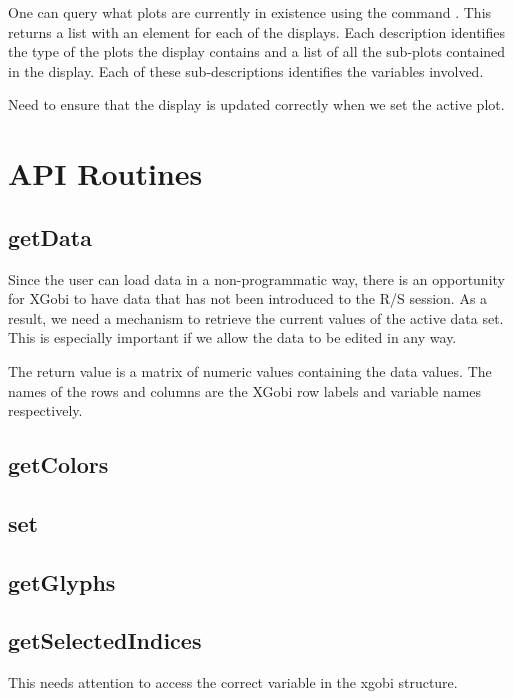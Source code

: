 One can query what plots are currently in existence using the command
.  This returns a list with an element
for each of the displays. Each description identifies the type of the
plots the display contains and a list of all the sub-plots contained
in the display. Each of these sub-descriptions identifies the
variables involved.



{\red Need to ensure that the display is updated correctly when
we set the active plot.}


\section{}


\section{API Routines}

\subsection{getData}
Since the user can load data in a non-programmatic way, there is an
opportunity for XGobi to have data that has not been introduced to the
R/S session.  As a result, we need a mechanism to retrieve the current
values of the active data set.  This is especially important if we
allow the data to be edited in any way.

The return value is a matrix of numeric values containing the data
values.  The names of the rows and columns are the XGobi row labels
and variable names respectively.


\subsection{getColors}


\subsection{set}

\subsection{getGlyphs}


\subsection{getSelectedIndices}
This needs attention to access the correct
variable in the xgobi structure.
